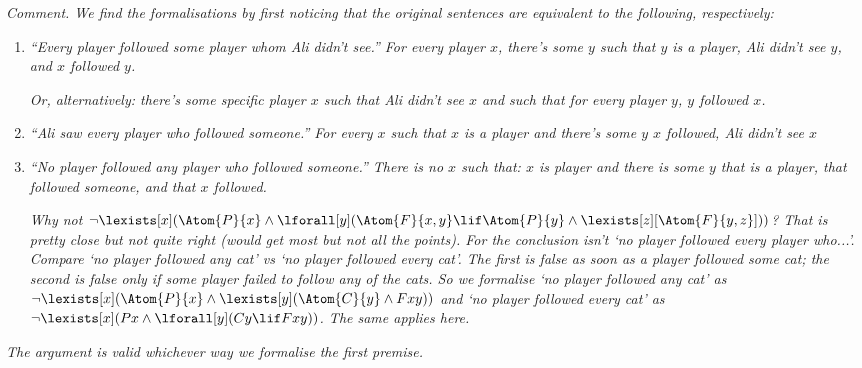 \documentclass[../../../include/open-logic-section]{subfiles}
\begin{document}
\begin{prob}
\begin{ans}
{\begin{minipage}{\textheight}
        \end{minipage}
    }

    
    \emph{Comment. We find the formalisations by first noticing that
    the original sentences are equivalent to the following,
    respectively:}
    \begin{enumerate}
    \item \emph{``Every player followed some player whom Ali didn't
    see.'' For every player $x$, there's some $y$ such that $y$ is a
    player, Ali didn't see $y$, and $x$ followed $y$.}

    \emph{Or, alternatively: there's some specific player $x$ 
    such that Ali didn't see $x$ and such that 
    for every player $y$, $y$ followed $x$.}

    \item \emph{``Ali saw every player who followed someone.'' For
    every $x$ such that $x$ is a player and there's some $y$ $x$
    followed, Ali didn't see $x$}
    \item \emph{``No player followed any player who followed
    someone.'' There is no $x$ such that: $x$ is player and there is
    some $y$ that is a player, that followed someone, and that $x$
    followed.}

    \emph{Why not $\lnot\lexists[x](\Atom{P}{x}\land\lforall[y](\Atom{F}{x,y}\lif
    \Atom{P}{y}\land\lexists[z][\Atom{F}{y,z}]))$? That is pretty close
    but not quite right (would get most but not all the points). 
    For the conclusion isn't `no player followed
    \emph{every} player who...'. Compare `no player
    followed any cat' vs `no player followed every cat'. The first is
    false as soon as a player followed \emph{some} cat; the second is
    false only if some player failed to follow \emph{any of} the cats. 
    So we formalise `no player followed any cat' as 
    $\lnot\lexists[x](\Atom{P}{x}\land\lexists[y](\Atom{C}{y}\land Fxy))$ 
    and `no player followed every
    cat' as $\lnot\lexists[x](Px\land\lforall[y](Cy\lif Fxy))$. The same
    applies here.}
    \end{enumerate}

    \emph{The argument is valid whichever way we formalise 
    the first premise.}
    

\end{ans}
\end{prob}
\end{document}
